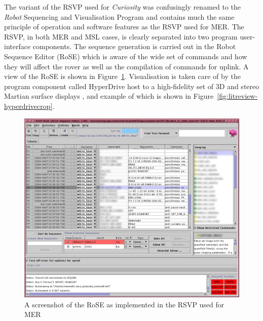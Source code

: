       The variant of the RSVP used for \textit{Curiosity} was confusingly renamed to the \textit{Robot} Sequencing and Visualisation Program and contains much the same principle of operation and software features as the RSVP used for MER. The RSVP, in both MER and MSL cases, is clearly separated into two program user-interface components. The sequence generation is carried out in the Robot Sequence Editor (RoSE) \cite{soseroverdrivingtools} which is aware of the wide set of commands and how they will affect the rover as well as the compilation of commands for uplink. A view of the RoSE is shown in Figure~\ref{fig:litreview-rose}. Visualisation is taken care of by the program component called HyperDrive host to a high-fidelity set of 3D and stereo Martian surface displays \cite{nasatechbrief2013rsvp}, and example of which is shown in Figure~\ref{fig:litreview-hyperdrivecrop}.
      
      \begin{figure}[h]
        \centering
        \includegraphics[width=0.7\linewidth]{figures/litreview-RoSE}
        \caption[A screenshot of the RoSE as implemented in the RSVP used for MER]{A screenshot of the RoSE as implemented in the RSVP used for MER \cite{fig:litreview-rose_cite}}
        \label{fig:litreview-rose}
      \end{figure}
      
